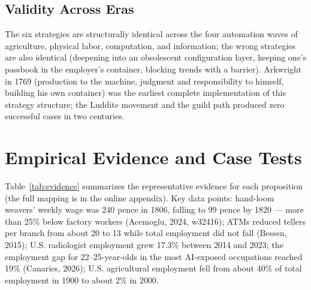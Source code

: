 \documentclass[11pt]{article}
\begin{document}
\subsection{Validity Across Eras}
The six strategies are structurally identical across the four automation waves of agriculture, physical labor, computation, and information; the wrong strategies are also identical (deepening into an obsolescent configuration layer, keeping one's passbook in the employer's container, blocking trends with a barrier). Arkwright in 1769 (production to the machine, judgment and responsibility to himself, building his own container) was the earliest complete implementation of this strategy structure; the Luddite movement and the guild path produced zero successful cases in two centuries.

\section{Empirical Evidence and Case Tests}
Table~\ref{tab:evidence} summarizes the representative evidence for each proposition (the full mapping is in the online appendix). Key data points: hand-loom weavers' weekly wage was 240 pence in 1806, falling to 99 pence by 1820 --- more than 25\% below factory workers (Acemoglu, 2024, w32416); ATMs reduced tellers per branch from about 20 to 13 while total employment did not fall (Bessen, 2015); U.S. radiologist employment grew 17.3\% between 2014 and 2023; the employment gap for 22--25-year-olds in the most AI-exposed occupations reached 19\% (Canaries, 2026); U.S. agricultural employment fell from about 40\% of total employment in 1900 to about 2\% in 2000.
\end{document}
